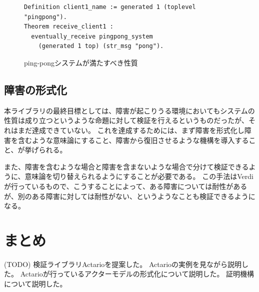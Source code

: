 \begin{figure}[tp]
\begin{lstlisting}
Definition client1_name := generated 1 (toplevel "pingpong").
Theorem receive_client1 :
  eventually_receive pingpong_system
    (generated 1 top) (str_msg "pong").
\end{lstlisting}
  \label{code:conclusion:pingpong-spec}
  \caption{ping-pongシステムが満たすべき性質}
\end{figure}

\subsection{障害の形式化}
本ライブラリの最終目標としては、障害が起こりうる環境においてもシステムの性質は成り立つというような命題に対して検証を行えるというものだったが、それはまだ達成できていない。
これを達成するためには、まず障害を形式化し障害を含むような意味論にすること、障害から復旧させるような機構を導入すること、が挙げられる。



また、障害を含むような場合と障害を含まないような場合で分けて検証できるように、意味論を切り替えられるようにすることが必要である。
この手法はVerdiが行っているもので、こうすることによって、ある障害については耐性があるが、別のある障害に対しては耐性がない、というようなことも検証できるようになる。


\section{まとめ}

(TODO)
検証ライブラリActarioを提案した。
Actarioの実例を見ながら説明した。
Actarioが行っているアクターモデルの形式化について説明した。
証明機構について説明した。
